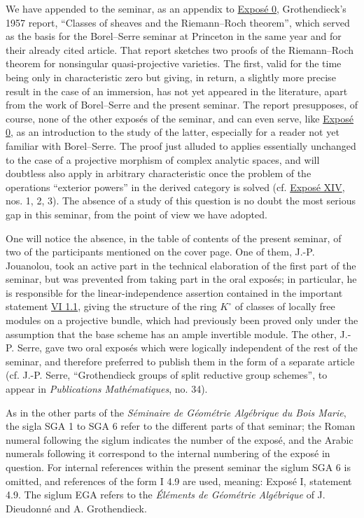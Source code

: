 We have appended to the seminar, as an appendix to \hyperlink{sga6.e00.expose}{Exposé 0}, Grothendieck's 1957 report, ``Classes of sheaves and the Riemann--Roch theorem'', which served as the basis for the Borel--Serre seminar at Princeton in the same year and for their already cited article. That report sketches two proofs of the Riemann--Roch theorem for nonsingular quasi-projective varieties. The first, valid for the time being only in characteristic zero but giving, in return, a slightly more precise result in the case of an immersion, has not yet appeared in the literature, apart from the work of Borel--Serre and the present seminar. The report presupposes, of course, none of the other exposés of the seminar, and can even serve, like \hyperlink{sga6.e00.expose}{Exposé 0}, as an introduction to the study of the latter, especially for a reader not yet familiar with Borel--Serre. The proof just alluded to applies essentially unchanged to the case of a projective morphism of complex analytic spaces, and will doubtless also apply in arbitrary characteristic once the problem of the operations ``exterior powers'' in the derived category is solved (cf. \hyperlink{sga6.e14.expose}{Exposé XIV}, nos. 1, 2, 3). The absence of a study of this question is no doubt the most serious gap in this seminar, from the point of view we have adopted.

One will notice the absence, in the table of contents of the present seminar, of two of the participants mentioned on the cover page. One of them, J.-P. Jouanolou, took an active part in the technical elaboration of the first part of the seminar, but was prevented from taking part in the oral exposés; in particular, he is responsible for the linear-independence assertion contained in the important statement \hyperlink{sga6.e06.thm.1-1}{VI 1.1}, giving the structure of the ring $K^\circ$ of classes of locally free modules on a projective bundle, which had previously been proved only under the assumption that the base scheme has an ample invertible module. The other, J.-P. Serre, gave two oral exposés which were logically independent of the rest of the seminar, and therefore preferred to publish them in the form of a separate article (cf. J.-P. Serre, ``Grothendieck groups of split reductive group schemes'', to appear in \emph{Publications Mathématiques}, no. 34).

As in the other parts of the \emph{Séminaire de Géométrie Algébrique du Bois Marie}, the sigla SGA 1 to SGA 6 refer to the different parts of that seminar; the Roman numeral following the siglum indicates the number of the exposé, and the Arabic numerals following it correspond to the internal numbering of the exposé in question. For internal references within the present seminar the siglum SGA 6 is omitted, and references of the form I 4.9 are used, meaning: Exposé I, statement 4.9. The siglum EGA refers to the \emph{Éléments de Géométrie Algébrique} of J. Dieudonné and A. Grothendieck.

